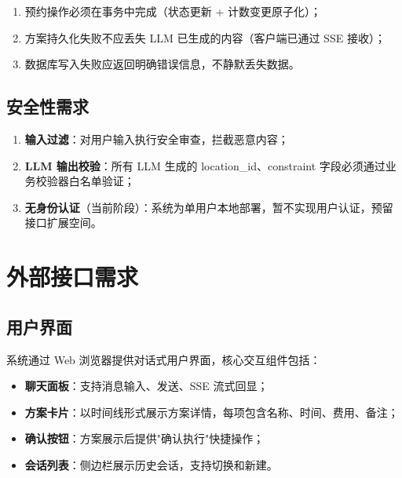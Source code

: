 \documentclass[12pt,a4paper]{ctexart}
\begin{document}
\begin{enumerate}[label=(\arabic*)]
  \item 预约操作必须在事务中完成（状态更新 + 计数变更原子化）；
  \item 方案持久化失败不应丢失 LLM 已生成的内容（客户端已通过 SSE 接收）；
  \item 数据库写入失败应返回明确错误信息，不静默丢失数据。
\end{enumerate}

\subsection{安全性需求}

\begin{enumerate}[label=(\arabic*)]
  \item \textbf{输入过滤}：对用户输入执行安全审查，拦截恶意内容；
  \item \textbf{LLM 输出校验}：所有 LLM 生成的 location\_id、constraint 字段必须通过业务校验器白名单验证；
  \item \textbf{无身份认证}（当前阶段）：系统为单用户本地部署，暂不实现用户认证，预留接口扩展空间。
\end{enumerate}

\newpage

\section{外部接口需求}

\subsection{用户界面}

系统通过 Web 浏览器提供对话式用户界面，核心交互组件包括：

\begin{itemize}
  \item \textbf{聊天面板}：支持消息输入、发送、SSE 流式回显；
  \item \textbf{方案卡片}：以时间线形式展示方案详情，每项包含名称、时间、费用、备注；
  \item \textbf{确认按钮}：方案展示后提供"确认执行"快捷操作；
  \item \textbf{会话列表}：侧边栏展示历史会话，支持切换和新建。
\end{itemize}
\end{document}
